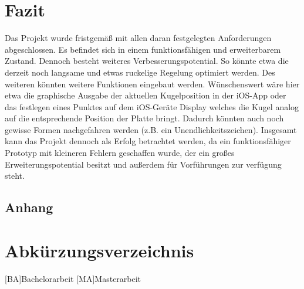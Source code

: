 \documentclass[12pt,a4paper,bibliography=totoc,listof=totoc]{scrartcl}
\begin{document}
\pagebreak
\section{Fazit}
Das Projekt wurde fristgemäß mit allen daran festgelegten Anforderungen abgeschlossen. Es befindet sich in einem 
funktionsfähigen und erweiterbarem Zustand. Dennoch besteht weiteres Verbesserungspotential. So könnte etwa die 
derzeit noch langsame und etwas ruckelige Regelung optimiert werden. Des weiteren könnten weitere Funktionen eingebaut werden. 
Wünschenswert wäre hier etwa die graphische Ausgabe der aktuellen Kugelposition in der iOS-App oder das festlegen eines Punktes auf
dem iOS-Geräte Display welches die Kugel analog auf die entsprechende Position der Platte bringt. Dadurch könnten auch noch gewisse 
Formen nachgefahren werden (z.B. ein Unendlichkeitszeichen).
\newline
Insgesamt kann das Projekt dennoch als Erfolg betrachtet werden, da ein funktionsfähiger Prototyp mit kleineren Fehlern geschaffen wurde, 
der ein großes Erweiterungspotential besitzt und außerdem für Vorführungen zur verfügung steht.

\pagebreak



\setcounter{page}{1}

\begin{appendix}
\section*{Anhang}
{}


\end{appendix}
\section{Abkürzungsverzeichnis}
\begin{acronym}[KDE]
	[BA]{Bachelorarbeit}
	[MA]{Masterarbeit}

\end{acronym}
\pagebreak
\end{document}
